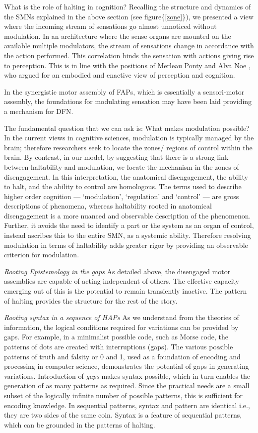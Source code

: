 {{{{{What is the role of halting in cognition?
Recalling the structure and dynamics of the SMNs explained in the above section (see figure\{\ref{zone}\}), we presented a view where the incoming stream of sensations go almost unnoticed without modulation. In an architecture where the sense organs are mounted on the available multiple modulators, the stream of sensations change in accordance with the action performed. This correlation binds the sensation with actions giving rise to perception. This is in line with the positions of Merleau Ponty \cite{ponty1969phenomenology} and Alva Noe \cite{noe_action_2004}, who argued for an embodied and enactive view of perception and cognition. 

In the synergistic motor assembly of FAPs, which is essentially a sensori-motor assembly, the foundations for modulating sensation may have been laid providing a mechanism for DFN. 

The fundamental question that we can ask is: What makes modulation possible? In the current views in cognitive sciences, modulation is typically managed by the brain; therefore researchers seek to locate the zones/ regions of control within the brain. By contrast, in our model, by suggesting that there is a strong link between haltability and modulation, we locate the mechanism in the zones of disengagement. In this interpretation, the anatomical disengagement, the ability to halt, and the ability to control are homologous. The terms used to describe higher order cognition --- `modulation', `regulation' and `control' --- are gross descriptions of phenomena, whereas haltability rooted in anatomical disengagement is a more nuanced and observable description of the phenomenon. Further, it avoids the need to identify a part or the system as an organ of control, instead ascribes this to the entire SMN, as a systemic ability. Therefore resolving modulation in terms of haltability adds greater rigor by providing an observable criterion for modulation. 

\emph{Rooting Epistemology in the gaps} As detailed above, the disengaged motor assemblies are capable of acting independent of others. The effective capacity emerging out of this is the potential to remain transiently inactive. The pattern of halting provides the structure for the rest of the story. 

\emph{Rooting syntax in a sequence of HAPs} As we understand from the theories of information, the logical conditions required for variations can be provided by gaps. For example, in a minimalist possible code, such as Morse code, the patterns of dots are created with interruptions (gaps). The various possible patterns of truth and falsity or 0 and 1, used as a foundation of encoding and processing in computer science, demonstrates the potential of gaps in generating variations. Introduction of \textit{gaps} makes syntax possible, which in turn enables the generation of as many patterns as required. Since the practical needs are a small subset of the logically infinite number of possible patterns, this is sufficient for encoding knowledge. In sequential patterns, syntax and pattern are identical i.e., they are two sides of the same coin. Syntax is a feature of sequential patterns, which can be grounded in the patterns of halting. 

}}}}}
